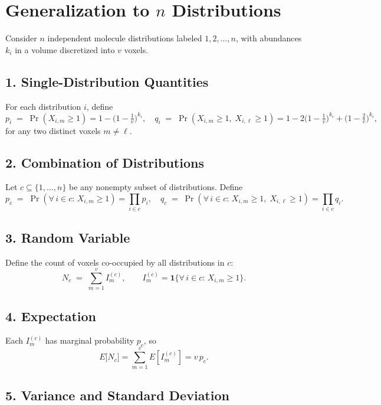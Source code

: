 \documentclass{article}
\begin{document}
\newpage
\section*{Generalization to \(n\) Distributions}

Consider \(n\) independent molecule distributions labeled \(1,2,\dots,n\), with abundances \(k_i\) in a volume discretized into \(v\) voxels.

\subsection*{1. Single-Distribution Quantities}

For each distribution \(i\), define
\[
p_i \;=\;\Pr(X_{i,m}\ge1)
=1-\bigl(1-\tfrac1v\bigr)^{k_i},
\quad
q_i \;=\;\Pr(X_{i,m}\ge1,\;X_{i,\ell}\ge1)
=1 - 2\bigl(1-\tfrac1v\bigr)^{k_i} + \bigl(1-\tfrac2v\bigr)^{k_i},
\]
for any two distinct voxels \(m\neq\ell\).

\subsection*{2. Combination of Distributions}

Let \(c\subseteq\{1,\dots,n\}\) be any nonempty subset of distributions.  Define
\[
p_c \;=\;\Pr(\forall\,i\in c:\,X_{i,m}\ge1)
=\prod_{i\in c} p_i,
\quad
q_c \;=\;\Pr(\forall\,i\in c:\,X_{i,m}\ge1,\;X_{i,\ell}\ge1)
=\prod_{i\in c} q_i.
\]

\subsection*{3. Random Variable}

Define the count of voxels co-occupied by all distributions in \(c\):
\[
N_c \;=\;\sum_{m=1}^v I^{(c)}_m,
\qquad
I^{(c)}_m = \mathbf{1}\{\forall\,i\in c:\,X_{i,m}\ge1\}.
\]

\subsection*{4. Expectation}

Each \(I^{(c)}_m\) has marginal probability \(p_c\), so
\[
E\bigl[N_c\bigr]
= \sum_{m=1}^v E[I^{(c)}_m]
= v\,p_c.
\]

\subsection*{5. Variance and Standard Deviation}
\end{document}
